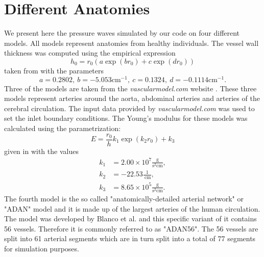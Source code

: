 \documentclass[a4paper, oneside]{discothesis}
\begin{document}
\section{Different Anatomies} \label{sec:da}
We present here the pressure waves simulated by our code on four different models.
All models represent anatomies from healthy individuals.
The vessel wall thickness was computed using the empirical expression
\begin{equation}
	h_0 = r_0 \left(a \exp(b r_0) + c \exp(d r_0)\right)
\end{equation}
taken from \cite{blanco2014anatomically} with the parameters
\begin{equation}
	a = 0.2802, \ b = -5.053 \text{cm}^{-1}, \ c = 0.1324,\  d = -0.1114 \text{cm}^{-1}.
\end{equation}
Three of the models are taken from the \emph{vascularmodel.com} website \cite{vascularmodel}.
These three models represent arteries around the aorta, abdominal arteries and arteries of the cerebral circulation.
The input data provided by \emph{vascularmodel.com} was used to set the inlet boundary conditions.
The Young's modulus for these models was calculated using the parametrization:
\begin{equation}
	E = \frac{r_0}{h} k_1 \exp(k_2 r_0) + k_3
\end{equation}
given in \cite{ottesen2004applied} with the values
\begin{align}
	k_1 &= 2.00 \times 10^7 \frac{\text{g}}{\text{s}^2\text{cm}}, \\
	k_2 &= -22.53 \frac{1}{\ \text{cm}}, \\
	k_3 &= 8.65 \times 10^5 \frac{\text{g}}{\text{s}^2\text{cm}}.
\end{align}
The fourth model is the so called "anatomically-detailed arterial network" or "ADAN" model and it is made up of the largest arteries of the human circulation.
The model was developed by Blanco et al. \cite{blanco2014anatomically,blanco2014blood} and this specific variant of it contains 56 vessels.
Therefore it is commonly referred to as "ADAN56".
The 56 vessels are split into 61 arterial segments which are in turn split into a total of 77 segments for simulation purposes.
\end{document}
